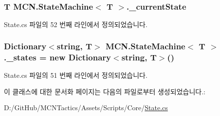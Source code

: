 \subsubsection[{\texorpdfstring{\+\_\+current\+State}{_currentState}}]{\setlength{\rightskip}{0pt plus 5cm}T {\bf M\+C\+N.\+State\+Machine}$<$ T $>$.\+\_\+current\+State\hspace{0.3cm}{\ttfamily [private]}}\hypertarget{class_m_c_n_1_1_state_machine_a040bf7c13d5127fe983af2ef0a6315ec}{}\label{class_m_c_n_1_1_state_machine_a040bf7c13d5127fe983af2ef0a6315ec}


State.\+cs 파일의 52 번째 라인에서 정의되었습니다.

\subsubsection[{\texorpdfstring{\+\_\+states}{_states}}]{\setlength{\rightskip}{0pt plus 5cm}Dictionary$<$string, T$>$ {\bf M\+C\+N.\+State\+Machine}$<$ T $>$.\+\_\+states = new Dictionary$<$string, T$>$()\hspace{0.3cm}{\ttfamily [private]}}\hypertarget{class_m_c_n_1_1_state_machine_adf0f1417aacb073306b88563e7b3d740}{}\label{class_m_c_n_1_1_state_machine_adf0f1417aacb073306b88563e7b3d740}


State.\+cs 파일의 51 번째 라인에서 정의되었습니다.



이 클래스에 대한 문서화 페이지는 다음의 파일로부터 생성되었습니다.\+:\begin{DoxyCompactItemize}
\item 
D\+:/\+Git\+Hub/\+M\+C\+N\+Tactics/\+Assets/\+Scripts/\+Core/\hyperlink{_state_8cs}{State.\+cs}\end{DoxyCompactItemize}
